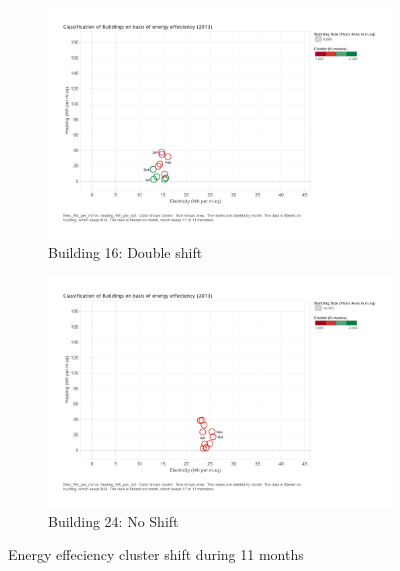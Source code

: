 \begin{figure}
        \begin{subfigure}[b]{0.45\textwidth}
                \includegraphics[width=\textwidth]{images/kmeans_B16_2c.pdf}
                \caption{Building 16: Double shift}
                \label{fig:dbl}
        \end{subfigure}
        \begin{subfigure}[b]{0.45\textwidth}
                        \includegraphics[width=\textwidth]{images/kmeans_b24_no.pdf}
                        \caption{Building 24: No Shift}
                        \label{fig:single}
       \end{subfigure}
     \caption{Energy effeciency cluster shift during 11 months}\label{fig:clustershift}
\end{figure}

